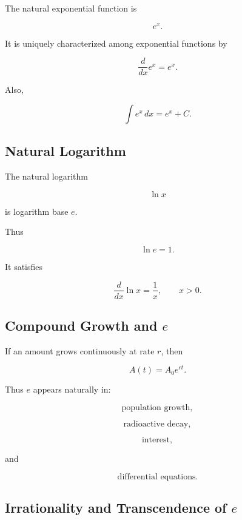 The natural exponential function is

\[
\boxed{
e^x.
}
\]

It is uniquely characterized among exponential functions by

\[
\boxed{
\frac{d}{dx}e^x
=
e^x.
}
\]

Also,

\[
\boxed{
\int e^x\,dx
=
e^x+C.
}
\]

\subsection{Natural Logarithm}
\label{subsec:natural-logarithm-constant-reference}

The natural logarithm

\[
\boxed{
\ln x
}
\]

is logarithm base \(e\).

Thus

\[
\boxed{
\ln e=1.
}
\]

It satisfies

\[
\boxed{
\frac{d}{dx}\ln x
=
\frac1x,
\qquad
x>0.
}
\]

\subsection{Compound Growth and \(e\)}
\label{subsec:e-compound-growth}

If an amount grows continuously at rate \(r\), then

\[
\boxed{
A(t)
=
A_0e^{rt}.
}
\]

Thus \(e\) appears naturally in:

\[
\boxed{
\text{population growth},
}
\]

\[
\boxed{
\text{radioactive decay},
}
\]

\[
\boxed{
\text{interest},
}
\]

and

\[
\boxed{
\text{differential equations}.
}
\]

\subsection{Irrationality and Transcendence of \(e\)}
\label{subsec:e-irrational-transcendental}

